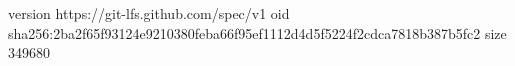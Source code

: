 version https://git-lfs.github.com/spec/v1
oid sha256:2ba2f65f93124e9210380feba66f95ef1112d4d5f5224f2cdca7818b387b5fc2
size 349680
